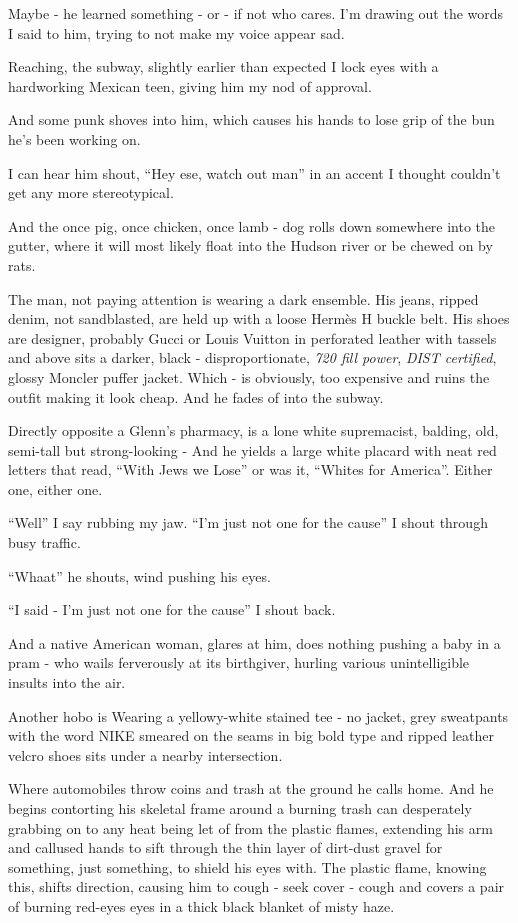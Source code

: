 \documentclass[19pt,openany]{book}
\begin{document}
Maybe - he learned something - or - if
not who cares. I'm drawing
out the words I said to him,
trying to not
make my voice appear sad.

Reaching, the subway,
slightly earlier than expected
I lock eyes
with a hardworking Mexican
teen,
giving him my nod of approval.

And some punk
shoves into him, which
causes his
hands to lose grip of the
bun he's been working on.

I can hear him shout, ``Hey
ese, watch out man'' in an
accent I thought couldn't
get any more stereotypical.

And the once pig, once
chicken, once lamb - dog rolls
down somewhere
into the gutter, where
it will most likely
float into the Hudson river
or be chewed on by rats.

The man, not paying
attention is wearing a
dark ensemble. His jeans,
ripped denim, not sandblasted,
are held up with a loose
Hermès H buckle belt. His
shoes are designer, probably
Gucci or Louis Vuitton in perforated
leather with tassels and above
sits a darker, black -
disproportionate,
\textit{720 fill power},
\textit{DIST certified}, glossy
Moncler puffer jacket.
Which - is obviously, too
expensive and
ruins the outfit making
it look cheap. And he fades
of into the subway.

Directly opposite
a Glenn's pharmacy, is a
lone white
supremacist, balding, old,
semi-tall but strong-looking -
And he yields
a large white placard with
neat red
letters that read, ``With
Jews we Lose''  or was it,
``Whites for America''.
Either one, either one.

``Well'' I say rubbing my
jaw. ``I'm just not one for
the cause'' I shout through
busy traffic.

``Whaat'' he shouts, wind pushing
his eyes.

``I said - I'm just not one for the cause''
I shout back.

And a native American
woman, glares
at him, does nothing pushing
a baby in a pram -
who wails ferverously at its
birthgiver, hurling
various unintelligible insults
into the air.

Another hobo is
Wearing a
yellowy-white stained tee
- no jacket, grey
sweatpants with the word
NIKE smeared on the seams
in big bold type and
ripped leather velcro shoes
sits under a nearby intersection.

Where automobiles throw
coins and trash at the ground he
calls home. And he begins
contorting his skeletal
frame around a
burning trash can
desperately grabbing on to any heat
being let of from the
plastic flames,
extending his arm
and callused hands to
sift through the thin
layer of dirt-dust gravel
for something, just
something, to shield his
eyes with. The plastic flame,
knowing this, shifts
direction,
causing him to
cough - seek cover - cough and
covers a pair of burning red-eyes
eyes in a thick black blanket of misty haze.
\end{document}
